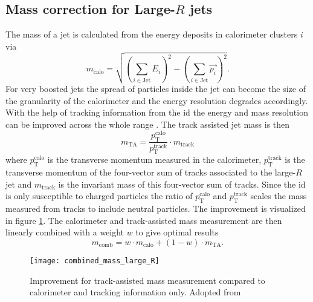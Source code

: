 \subsection{Mass correction for Large-$R$ jets}
The mass of a jet is calculated from the energy deposits in calorimeter clusters $i$ via
\begin{equation}
  m_{\text{calo}} = \sqrt{\left(\sum_{i\in \text{Jet}}E_i\right)^2-\left(\sum_{i\in \text{Jet}}\vec{p_i}\right)^2}.
\end{equation}
For very boosted jets the spread of particles inside the jet can become the size of the granularity of the calorimeter and the energy resolution degrades accordingly. With the help of tracking information from the \ac{id} the energy and mass resolution can be improved across the whole \pt range \citep{Aaboud:2019aa}. The track assisted jet mass is then
\begin{equation}
  m_{\text{TA}} = \frac{p_{\text{T}}^{\text{calo}}}{p_{\text{T}}^{\text{track}}} \cdot m_{\text{track}}
\end{equation}
where $p_{\text{T}}^{\text{calo}}$ is the transverse momentum measured in the calorimeter, $p_{\text{T}}^{\text{track}}$ is the transverse momentum of the four-vector sum of tracks associated to the large-$R$ jet and $m_\text{track}$ is the invariant mass of this four-vector sum of tracks. Since the \ac{id} is only susceptible to charged particles the ratio of $p_{\text{T}}^{\text{calo}}$ and $p_{\text{T}}^{\text{track}}$ scales the mass measured from tracks to include neutral particles. The improvement is visualized in figure \ref{fig:combined_mass_large_R}. The calorimeter and track-assisted mass measurement are then linearly combined with a weight $w$ to give optimal results
\begin{equation}
  m_{\text{comb}} =  w\cdot m_{\text{calo}}+(1-w)\cdot m_{\text{TA}}.
\end{equation}
\begin{figure}
  \centering
  \texttt{[image: combined\_mass\_large\_R]}
  \caption[]{Improvement for track-assisted mass measurement compared to calorimeter and tracking information only. Adopted from \citep{ATLAS-CONF-2016-035} }
  \label{fig:combined_mass_large_R}
\end{figure}
